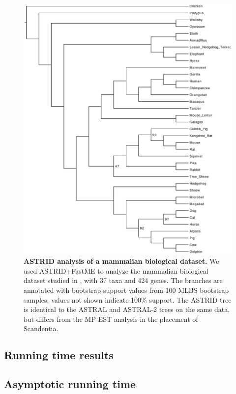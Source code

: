 \begin{figure}
\centering
\includegraphics[width=12cm]{astrid-figs/astrid-biological.eps}
  \caption[ASTRID analysis of a mammalian
biological dataset]{\textbf{ASTRID analysis of a mammalian
biological dataset.} 
We used ASTRID+FastME to 
analyze the mammalian biological dataset 
studied in \cite{statbinning,ASTRAL}, with 37 taxa and
424 genes. 
The branches are
annotated with 
bootstrap support values from 100 MLBS bootstrap samples;
values not shown indicate 100\% support.
The ASTRID tree is identical to the ASTRAL and ASTRAL-2 trees on the same data,
but differs from the MP-EST analysis in the placement of Scandentia.}
  \label{astrid::fig:astrid-biological}
\end{figure}




\subsection{Running time results}

\subsection{Asymptotic running time}

